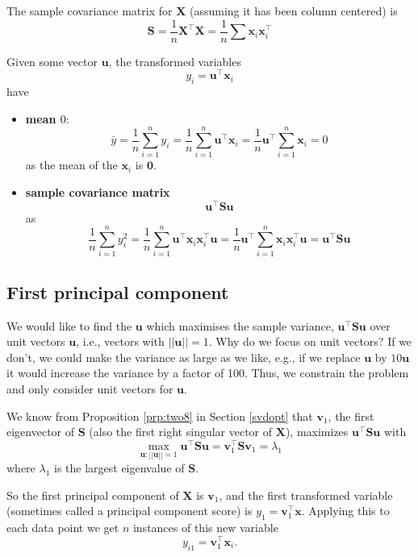 \documentclass[
]{book}
\theoremstyle{definition}
\theoremstyle{definition}
\theoremstyle{definition}
\theoremstyle{definition}
\theoremstyle{remark}
\begin{document}
The sample covariance matrix for \(\mathbf X\) (assuming it has been column centered) is
\[\mathbf S= \frac{1}{n}\mathbf X^\top \mathbf X= \frac{1}{n}\sum \mathbf x_i\mathbf x_i^\top\]

Given some vector \(\mathbf u\), the transformed variables
\[y_i = \mathbf u^\top \mathbf x_i\]
have

\begin{itemize}
\item
  \textbf{mean \(0\)}:
  \[\bar{y}= \frac{1}{n}\sum_{i=1}^n y_i = \frac{1}{n}\sum_{i=1}^n \mathbf u^\top \mathbf x_i =\frac{1}{n} \mathbf u^\top \sum_{i=1}^n  \mathbf x_i = 0\]
  as the mean of the \(\mathbf x_i\) is \({\boldsymbol 0}\).
\item
  \textbf{sample covariance matrix} \[\mathbf u^\top \mathbf S\mathbf u\]
  as
  \[\frac{1}{n} \sum_{i=1}^n y_i^2 = \frac{1}{n} \sum_{i=1}^n \mathbf u^\top \mathbf x_i \mathbf x_i^\top\mathbf u= \frac{1}{n}\mathbf u^\top \sum_{i=1}^n  \mathbf x_i \mathbf x_i^\top \mathbf u= \mathbf u^\top \mathbf S\mathbf u
  \]
\end{itemize}

\subsection{First principal component}\label{first-principal-component}

We would like to find the \(\mathbf u\) which maximises the sample variance, \(\mathbf u^\top \mathbf S\mathbf u\) over unit vectors \(\mathbf u\), i.e., vectors with \(||\mathbf u||=1\). Why do we focus on unit vectors? If we don't, we could make the variance as large as we like, e.g., if we replace \(\mathbf u\) by \(10\mathbf u\) it would increase the variance by a factor of 100. Thus, we constrain the problem and only consider unit vectors for \(\mathbf u\).

We know from Proposition \ref{prp:two8} in Section \ref{svdopt} that \(\mathbf v_1\), the first eigenvector of \(\mathbf S\) (also the first right singular vector of \(\mathbf X\)), maximizes \(\mathbf u^\top \mathbf S\mathbf u\) with
\[  \max_{\mathbf u: ||\mathbf u||=1} \mathbf u^\top \mathbf S\mathbf u= \mathbf v_1^\top \mathbf S\mathbf v_1 =\lambda_1\]
where \(\lambda_1\) is the largest eigenvalue of \(\mathbf S\).

So the first principal component of \(\mathbf X\) is \(\mathbf v_1\), and the first transformed variable (sometimes called a principal component score) is \(y_1 = \mathbf v_1 ^\top \mathbf x\).
Applying this to each data point we get \(n\) instances of this new variable
\[y_{i1} = \mathbf v_1 ^\top \mathbf x_i.\]
\end{document}
